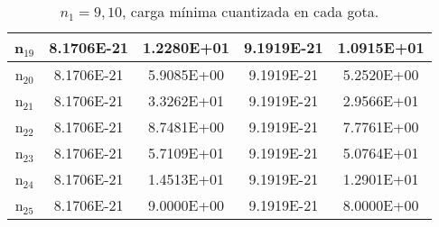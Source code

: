 \documentclass{article}
\begin{document}
\begin{enumerate}
\begin{table}[h!]
\begin{tabular}{|c|c|c|c|c|}
       \hline       
       n$_{19}$  & 8.1706E-21 & 1.2280E+01 & 9.1919E-21 & 1.0915E+01\\
       \hline       
       n$_{20}$  & 8.1706E-21 & 5.9085E+00 & 9.1919E-21 & 5.2520E+00\\
       \hline       
       n$_{21}$  & 8.1706E-21 & 3.3262E+01 & 9.1919E-21 & 2.9566E+01\\
       \hline       
       n$_{22}$  & 8.1706E-21 & 8.7481E+00 & 9.1919E-21 & 7.7761E+00\\
       \hline       
       n$_{23}$  & 8.1706E-21 & 5.7109E+01 & 9.1919E-21 & 5.0764E+01\\
       \hline       
       n$_{24}$  & 8.1706E-21 & 1.4513E+01 & 9.1919E-21 & 1.2901E+01\\
       \hline       
       n$_{25}$  & 8.1706E-21 & 9.0000E+00 & 9.1919E-21 & 8.0000E+00\\
       \hline

    \end{tabular}
    \caption{$n_{1}=9,10$, carga mínima cuantizada en cada gota.}
    \label{tab:my_label}
\end{table}


\begin{table}[h!]
    \centering
    

\end{table}
\end{enumerate}
\end{document}
